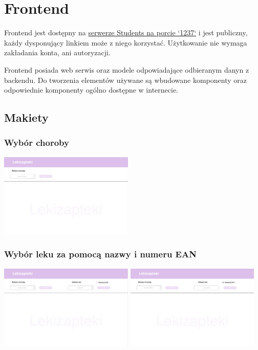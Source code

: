 \documentclass{article}
\begin{document}
  \section{Frontend}
  Frontend jest dostępny na
  \href{http://students.mimuw.edu.pl:1237}{serwerze Students na porcie `1237`} i jest publiczny,
  każdy dysponujący linkiem może z niego korzystać.
  Użytkowanie nie wymaga zakładania konta, ani autoryzacji.

  Frontend posiada web serwis oraz modele odpowiadające odbieranym danyn z backendu.
  Do tworzenia elementów używane są wbudowane komponenty oraz odpowiednie komponenty ogólno dostępne w internecie.

    \subsection{Makiety}
      \subsubsection{Wybór choroby}
      \includegraphics[width=6.4cm, height=4cm]{lekizapteki-wybor-choroby}

      \subsubsection{Wybór leku za pomocą nazwy i numeru EAN}
      \includegraphics[width=6.4cm, height=4cm]{lekizapteki-wybor-leku-nazwa}
      \includegraphics[width=6.4cm, height=4cm]{lekizapteki-wybor-leku-ean}
\end{document}
